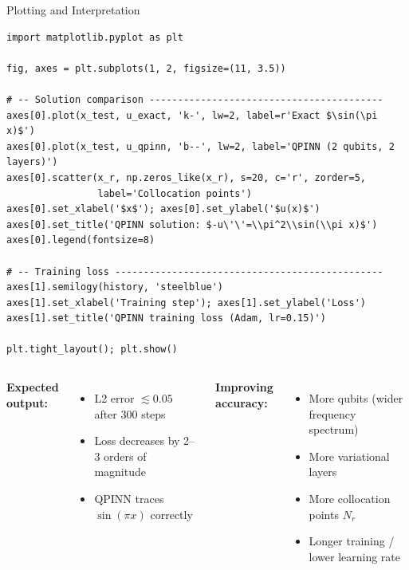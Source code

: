 \documentclass[aspectratio=169,10pt]{beamer}
\begin{document}
\begin{frame}[fragile]{Plotting and Interpretation}
  \begin{lstlisting}
import matplotlib.pyplot as plt

fig, axes = plt.subplots(1, 2, figsize=(11, 3.5))

# -- Solution comparison -----------------------------------------
axes[0].plot(x_test, u_exact, 'k-', lw=2, label=r'Exact $\sin(\pi x)$')
axes[0].plot(x_test, u_qpinn, 'b--', lw=2, label='QPINN (2 qubits, 2 layers)')
axes[0].scatter(x_r, np.zeros_like(x_r), s=20, c='r', zorder=5,
                label='Collocation points')
axes[0].set_xlabel('$x$'); axes[0].set_ylabel('$u(x)$')
axes[0].set_title('QPINN solution: $-u\'\'=\\pi^2\\sin(\\pi x)$')
axes[0].legend(fontsize=8)

# -- Training loss -----------------------------------------------
axes[1].semilogy(history, 'steelblue')
axes[1].set_xlabel('Training step'); axes[1].set_ylabel('Loss')
axes[1].set_title('QPINN training loss (Adam, lr=0.15)')

plt.tight_layout(); plt.show()
  \end{lstlisting}

  \vspace{0.2cm}
  \begin{columns}[T]
      \textbf{Expected output:}
      \begin{itemize}
        \item L2 error $\lesssim 0.05$ after 300 steps
        \item Loss decreases by 2--3 orders of magnitude
        \item QPINN traces $\sin(\pi x)$ correctly
      \end{itemize}
      \textbf{Improving accuracy:}
      \begin{itemize}
        \item More qubits (wider frequency spectrum)
        \item More variational layers
        \item More collocation points $N_r$
        \item Longer training / lower learning rate
      \end{itemize}
  \end{columns}
\end{frame}
\end{document}
